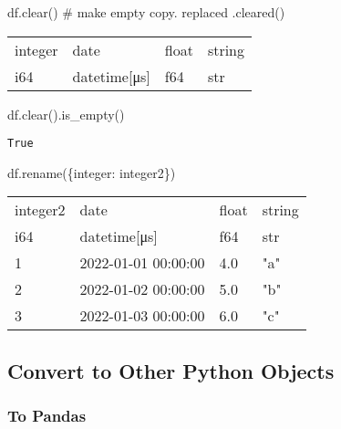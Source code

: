 \documentclass[
  letterpaper,
  DIV=11,
  numbers=noendperiod]{scrartcl}
\newenvironment{Shaded}{\begin{snugshade}}{\end{snugshade}}
\newcommand{\CommentTok}[1]{\textcolor[rgb]{0.37,0.37,0.37}{#1}}
\newcommand{\NormalTok}[1]{\textcolor[rgb]{0.00,0.23,0.31}{#1}}
\newcommand{\StringTok}[1]{\textcolor[rgb]{0.13,0.47,0.30}{#1}}
\begin{document}
\begin{Shaded}
\begin{Highlighting}[]
\NormalTok{df.clear() }\CommentTok{\# make empty copy. replaced .cleared()}
\end{Highlighting}
\end{Shaded}

\begin{longtable}[]{@{}llll@{}}
\toprule()
integer & date & float & string \\
i64 & datetime{[}μs{]} & f64 & str \\
\midrule()
\endhead
\bottomrule()
\end{longtable}

\begin{Shaded}
\begin{Highlighting}[]
\NormalTok{df.clear().is\_empty()}
\end{Highlighting}
\end{Shaded}

\begin{verbatim}
True
\end{verbatim}

\begin{Shaded}
\begin{Highlighting}[]
\NormalTok{df.rename(\{}\StringTok{\textquotesingle{}integer\textquotesingle{}}\NormalTok{: }\StringTok{\textquotesingle{}integer2\textquotesingle{}}\NormalTok{\})}
\end{Highlighting}
\end{Shaded}

\begin{longtable}[]{@{}llll@{}}
\toprule()
integer2 & date & float & string \\
i64 & datetime{[}μs{]} & f64 & str \\
\midrule()
\endhead
1 & 2022-01-01 00:00:00 & 4.0 & "a" \\
2 & 2022-01-02 00:00:00 & 5.0 & "b" \\
3 & 2022-01-03 00:00:00 & 6.0 & "c" \\
\bottomrule()
\end{longtable}

\hypertarget{convert-to-other-python-objects}{%
\subsection{Convert to Other Python
Objects}\label{convert-to-other-python-objects}}

\hypertarget{to-pandas}{%
\subsubsection{To Pandas}\label{to-pandas}}
\end{document}
